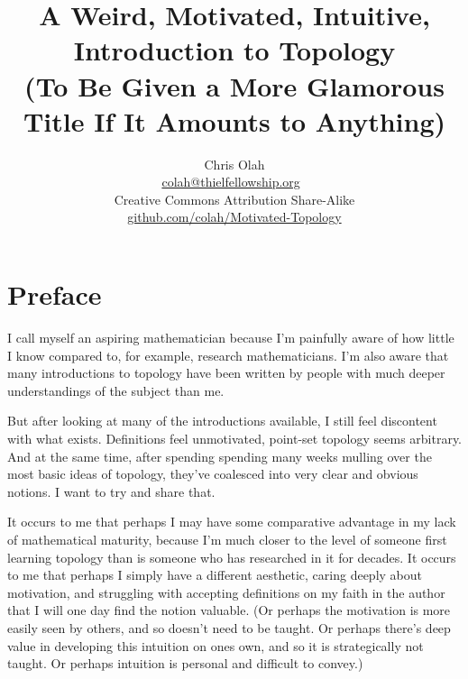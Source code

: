 \documentclass{report}
\begin{document}
\title{A Weird, Motivated, Intuitive, Introduction to Topology\\{\small(To Be Given a More Glamorous Title If It Amounts to Anything)}}
\author{Chris Olah\\ $~$\\ \href{mailto:colah@thielfellowship.org}{colah@thielfellowship.org} $~$\\ $~$\\ $~$\\ Creative Commons Attribution Share-Alike \\  \href{https://github.com/colah/Motivated-Topology}{github.com/colah/Motivated-Topology}\\ $~$\\}

\maketitle

\tableofcontents

\chapter*{Preface}

I call myself an aspiring mathematician because I'm painfully aware of how little I know compared to, for example, research mathematicians. I'm also aware that many introductions to topology have been written by people with much deeper understandings of the subject than me.

But after looking at many of the introductions available, I still feel discontent with what exists. Definitions feel unmotivated, point-set topology seems arbitrary. And at the same time, after spending spending many weeks mulling over the most basic ideas of topology, they've coalesced into very clear and obvious notions. I want to try and share that.

It occurs to me that perhaps I may have some comparative advantage in my lack of mathematical maturity, because I'm much closer to the level of someone first learning topology than is someone who has researched in it for decades. It occurs to me that perhaps I simply have a different aesthetic, caring deeply about motivation, and struggling with accepting definitions on my faith in the author that I will one day find the notion valuable. (Or perhaps the motivation is more easily seen by others, and so doesn't need to be taught. Or perhaps there's deep value in developing this intuition on ones own, and so it is strategically not taught. Or perhaps intuition is personal and difficult to convey.)
\end{document}
